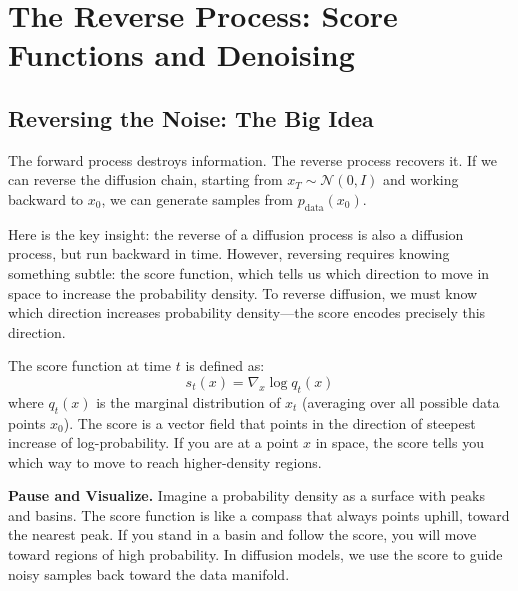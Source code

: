 \vspChapter

\section{The Reverse Process: Score Functions and Denoising}
\label{sec:reverse_process}

\vspBlock

\subsection{Reversing the Noise: The Big Idea}

The forward process destroys information. The reverse process recovers it. If we can reverse the diffusion chain, starting from $x_T \sim \mathcal{N}(0,I)$ and working backward to $x_0$, we can generate samples from $p_{\text{data}}(x_0)$.

\vspPara

Here is the key insight: the reverse of a diffusion process is also a diffusion process, but run backward in time. However, reversing requires knowing something subtle: the score function, which tells us which direction to move in space to increase the probability density. To reverse diffusion, we must know which direction increases probability density---the score encodes precisely this direction.

\vspPara

The score function at time $t$ is defined as:
%
\begin{equation}
s_t(x) = \nabla_x \log q_t(x)
\end{equation}
%
where $q_t(x)$ is the marginal distribution of $x_t$ (averaging over all possible data points $x_0$). The score is a vector field that points in the direction of steepest increase of log-probability. If you are at a point $x$ in space, the score tells you which way to move to reach higher-density regions.

\vspSection

\begin{pausebox}
\textbf{Pause and Visualize.} Imagine a probability density as a surface with peaks and basins. The score function is like a compass that always points uphill, toward the nearest peak. If you stand in a basin and follow the score, you will move toward regions of high probability. In diffusion models, we use the score to guide noisy samples back toward the data manifold.
\end{pausebox}

